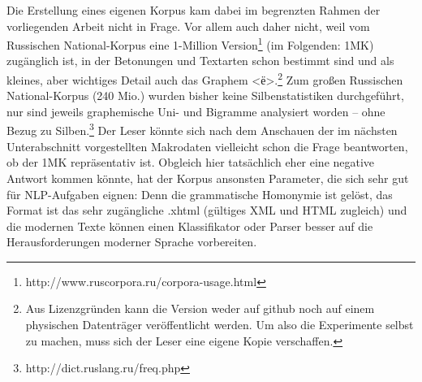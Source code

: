 \documentclass[12pt,headsepline,a4paper]{scrartcl}
\newcommand\textcyr[1]{{\fontencoding{OT2}\fontfamily{wncyr}\selectfont #1}}
\begin{document}
Die Erstellung eines eigenen Korpus kam dabei im begrenzten Rahmen der vorliegenden Arbeit nicht in Frage. Vor allem auch daher nicht, weil vom Russischen National-Korpus eine 1-Million Version\footnote{http://www.ruscorpora.ru/corpora-usage.html} (im Folgenden: 1MK) zugänglich ist, in der  Betonungen und Textarten schon bestimmt sind und als kleines, aber wichtiges Detail auch das Graphem <\textcyr{ё}>.\footnote{Aus Lizenzgründen kann die Version weder auf github noch auf einem physischen Datenträger veröffentlicht werden. Um also die Experimente selbst zu machen, muss sich der Leser eine eigene Kopie verschaffen.}
Zum großen Russischen National-Korpus (240 Mio.) wurden bisher keine Silbenstatistiken durchgeführt, nur sind jeweils graphemische Uni- und Bigramme analysiert worden -- ohne Bezug zu Silben.\footnote{http://dict.ruslang.ru/freq.php} Der Leser könnte sich nach dem Anschauen der im nächsten Unterabschnitt vorgestellten Makrodaten vielleicht schon die Frage beantworten, ob der 1MK repräsentativ ist. Obgleich hier tatsächlich eher eine negative Antwort kommen könnte, hat der Korpus ansonsten Parameter, die sich sehr gut für NLP-Aufgaben eignen: Denn die grammatische Homonymie ist gelöst, das Format ist das sehr zugängliche \textsf{.xhtml} (gültiges XML und HTML zugleich) und die modernen Texte können einen Klassifikator oder Parser besser auf die Herausforderungen moderner Sprache vorbereiten.
\end{document}
